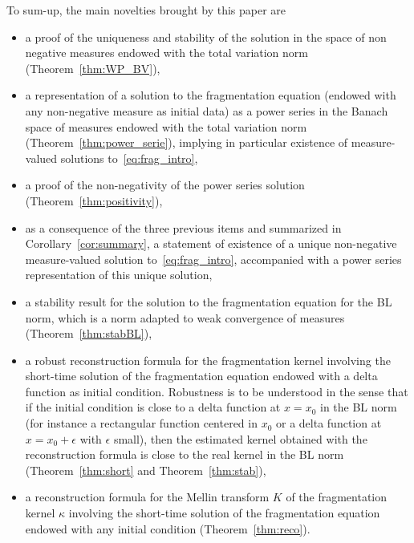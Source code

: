 \documentclass[AHL,Unicode,longabstracts,published]{cedram}
\begin{document}
To sum-up, the main novelties brought by this paper are
\begin{itemize}
\item a proof of the uniqueness and stability of the solution in the space of non negative measures endowed with the total variation norm (Theorem~\ref{thm:WP_BV}),
\item a representation of a solution to the fragmentation equation (endowed with any non-negative measure as initial data) as a power series in the Banach space of measures endowed with the total variation norm (Theorem~\ref{thm:power_serie}), implying in particular existence of measure-valued solutions to~\eqref{eq:frag_intro},
\item a proof of the non-negativity of the power series solution (Theorem~\ref{thm:positivity}),
\item as a consequence of the three previous items and summarized in Corollary~\ref{cor:summary}, a statement of existence of a unique non-negative measure-valued solution to~\eqref{eq:frag_intro}, accompanied with a power series representation of this unique solution,
\item a stability result for the solution to the fragmentation equation for the BL norm, which is a norm adapted to weak convergence of measures (Theorem~\ref{thm:stabBL}),
\item a robust reconstruction formula for the fragmentation kernel involving the short-time solution of the fragmentation equation endowed with a delta function as initial condition. Robustness is to be understood in the sense that if the initial condition is close to a delta function at $x=x_0$ in the BL norm (for instance a rectangular function centered in $x_0$ or a delta function at $x=x_0+\epsilon$ with $\epsilon$ small), then the estimated kernel obtained with the reconstruction formula is close to the real kernel in the BL norm (Theorem~\ref{thm:short} and Theorem~\ref{thm:stab}),
\item a reconstruction formula for the Mellin transform $K$ of the fragmentation kernel $\kappa$ involving the short-time solution of the fragmentation equation endowed with any initial condition (Theorem~\ref{thm:reco}).
\end{itemize}
\end{document}
